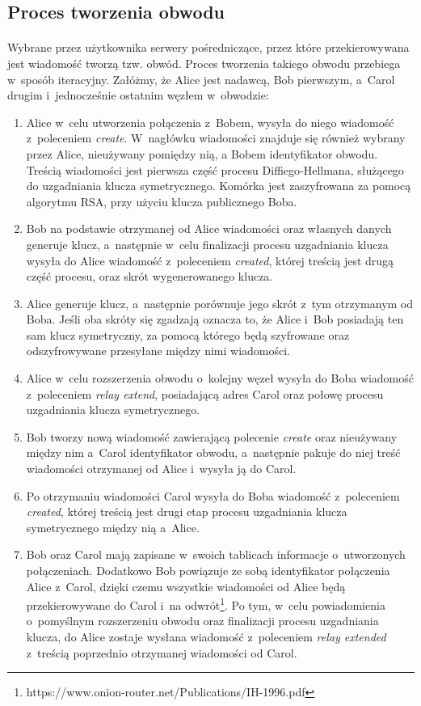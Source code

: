 \subsection{Proces tworzenia obwodu}\paragraph{}
Wybrane przez użytkownika serwery pośredniczące, przez które przekierowywana jest wiadomość tworzą tzw. obwód. Proces tworzenia takiego obwodu przebiega w~sposób iteracyjny. Załóżmy, że Alice jest nadawcą, Bob pierwszym, a~Carol drugim i~jednocześnie ostatnim węzłem w~obwodzie:
\begin{enumerate}
 \item Alice w~celu utworzenia połączenia z~Bobem, wysyła do niego wiadomość z~poleceniem \textit{create}. W~nagłówku wiadomości znajduje się również wybrany przez Alice, nieużywany pomiędzy nią, a Bobem identyfikator obwodu. Treścią wiadomości jest pierwsza część procesu  Diffiego-Hellmana, służącego do uzgadniania klucza symetrycznego. Komórka jest zaszyfrowana za pomocą algorytmu RSA, przy użyciu klucza publicznego Boba.
 \item Bob na podstawie otrzymanej od Alice wiadomości oraz własnych danych generuje klucz, a~następnie w~celu finalizacji procesu uzgadniania klucza wysyła do Alice wiadomość z~poleceniem \textit{created}, której treścią jest drugą część procesu, oraz skrót wygenerowanego klucza.
 \item Alice generuje klucz, a~następnie porównuje jego skrót z~tym otrzymanym od Boba. Jeśli oba skróty się zgadzają oznacza to, że Alice i~Bob posiadają ten sam klucz symetryczny, za pomocą którego będą szyfrowane oraz odszyfrowywane przesyłane między nimi wiadomości.
 \item Alice w~celu rozszerzenia obwodu o~kolejny węzeł wysyła do Boba wiadomość z~poleceniem \textit{relay extend}, posiadającą adres Carol oraz połowę procesu uzgadniania klucza symetrycznego.
 \item Bob tworzy nową wiadomość zawierającą polecenie \textit{create} oraz nieużywany między nim a~Carol identyfikator obwodu, a~następnie pakuje do niej treść wiadomości otrzymanej od Alice i~wysyła ją do Carol.
 \item Po otrzymaniu wiadomości Carol wysyła do Boba wiadomość z~poleceniem \textit{created}, której treścią jest drugi etap procesu uzgadniania klucza symetrycznego między nią a~Alice.
 \item Bob oraz Carol mają zapisane w~swoich tablicach informacje o~utworzonych połączeniach. Dodatkowo Bob powiązuje ze sobą identyfikator połączenia Alice z~Carol, dzięki czemu wszystkie wiadomości od Alice będą przekierowywane do Carol i~na odwrót\footnote{https://www.onion-router.net/Publications/IH-1996.pdf\label{link:hiding-information}}. Po tym, w~celu powiadomienia o~pomyślnym rozszerzeniu obwodu oraz finalizacji procesu uzgadniania klucza, do Alice zostaje wysłana wiadomość z~poleceniem \textit{relay extended} z~treścią poprzednio otrzymanej wiadomości od Carol.

\end{enumerate}
